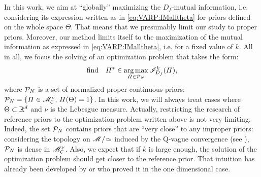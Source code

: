 In this work, we aim at ``globally'' maximizing the $D_f$-mutual information, i.e. considering its expression written as in \cref{eq:VARP:IMalltheta} for priors defined on the whole space $\Theta$.
That means that we presumably limit our study to proper priors. 
Moreover, our method limits itself to the maximization of the mutual information as expressed in \cref{eq:VARP:IMalltheta}, i.e. for a fixed value of $k$.
All in all, we focus the solving of an optimization problem that takes the form:
    \begin{equation}\label{eq:VARP:optimproblemintro}
        \text{find}\quad\varPi^\ast\in\operatorname*{arg\,max}_{\varPi\in\mathcal{P}_N} \mathscr{I}^k_{D_f}(\varPi),
    \end{equation}
where $\mathcal{P}_N$ is a set of normalized proper continuous priors: $\mathcal{P}_N=\{\varPi\in\mathscr{M}^\nu_{\mathcal{C}},\,\varPi(\Theta)=1 \}$. In this work, we will always treat cases where $\Theta\subset\mathbb{R}^d$ and $\nu$ is the Lebesgue measure.
Actually, restricting the research of reference priors to the optimization problem written above is not very limiting. Indeed, the set $\mathcal{P}_N$ contains priors that are ``very close'' to any improper priors: considering the topology on $\mathscr{M}/\!\simeq$ induced by the Q-vague convergence (see \cite{bioche_approximation_2016}), $\mathcal{P}_N$ is dense in $\mathscr{M}^\nu_{\mathcal{C}}$.
Also, we expect that if $k$ is large enough, the solution of the optimization problem should get closer to the reference prior. That intuition has already been developed by \citet{berger_formal_2009} or \cite{le_formal_2014} who proved it in the one dimensional case.






